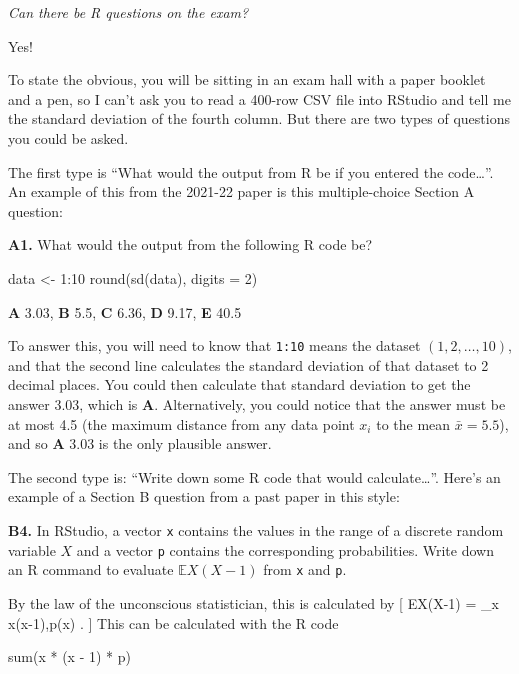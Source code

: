 \documentclass[
  letterpaper,
]{report}
\newenvironment{Shaded}{\begin{snugshade}}{\end{snugshade}}
\newcommand{\AttributeTok}[1]{\textcolor[rgb]{0.40,0.45,0.13}{#1}}
\newcommand{\DecValTok}[1]{\textcolor[rgb]{0.68,0.00,0.00}{#1}}
\newcommand{\FunctionTok}[1]{\textcolor[rgb]{0.28,0.35,0.67}{#1}}
\newcommand{\NormalTok}[1]{\textcolor[rgb]{0.00,0.23,0.31}{#1}}
\newcommand{\OtherTok}[1]{\textcolor[rgb]{0.00,0.23,0.31}{#1}}
\newcommand{\SpecialCharTok}[1]{\textcolor[rgb]{0.37,0.37,0.37}{#1}}
\theoremstyle{definition}
\theoremstyle{definition}
\theoremstyle{remark}
\begin{document}
\emph{Can there be R questions on the exam?}

Yes!

To state the obvious, you will be sitting in an exam hall with a paper
booklet and a pen, so I can't ask you to read a 400-row CSV file into
RStudio and tell me the standard deviation of the fourth column. But
there are two types of questions you could be asked.

The first type is ``What would the output from R be if you entered the
code\ldots{}''. An example of this from the 2021-22 paper is this
multiple-choice Section A question:

\textbf{A1.} What would the output from the following R code be?

\begin{Shaded}
\begin{Highlighting}[]
\NormalTok{data }\OtherTok{\textless{}{-}} \DecValTok{1}\SpecialCharTok{:}\DecValTok{10}
\FunctionTok{round}\NormalTok{(}\FunctionTok{sd}\NormalTok{(data), }\AttributeTok{digits =} \DecValTok{2}\NormalTok{)}
\end{Highlighting}
\end{Shaded}

\textbf{A} 3.03, \textbf{B} 5.5, \textbf{C} 6.36, \textbf{D} 9.17,
\textbf{E} 40.5

To answer this, you will need to know that \texttt{1:10} means the
dataset \((1, 2, \dots, 10)\), and that the second line calculates the
standard deviation of that dataset to 2 decimal places. You could then
calculate that standard deviation to get the answer 3.03, which is
\textbf{A}. Alternatively, you could notice that the answer must be at
most 4.5 (the maximum distance from any data point \(x_i\) to the mean
\(\bar x = 5.5\)), and so \textbf{A} 3.03 is the only plausible answer.

The second type is: ``Write down some R code that would
calculate\ldots{}''. Here's an example of a Section B question from a
past paper in this style:

\textbf{B4.} In RStudio, a vector \texttt{x} contains the values in the
range of a discrete random variable \(X\) and a vector \texttt{p}
contains the corresponding probabilities. Write down an R command to
evaluate \(\mathbb EX(X-1)\) from \texttt{x} and \texttt{p}.

By the law of the unconscious statistician, this is calculated by {[}
\mathbb EX(X-1) = \sum\_x x(x-1),p(x) . {]} This can be calculated with
the R code

\begin{Shaded}
\begin{Highlighting}[]
\FunctionTok{sum}\NormalTok{(x }\SpecialCharTok{*}\NormalTok{ (x }\SpecialCharTok{{-}} \DecValTok{1}\NormalTok{) }\SpecialCharTok{*}\NormalTok{ p)}
\end{Highlighting}
\end{Shaded}
\end{document}
